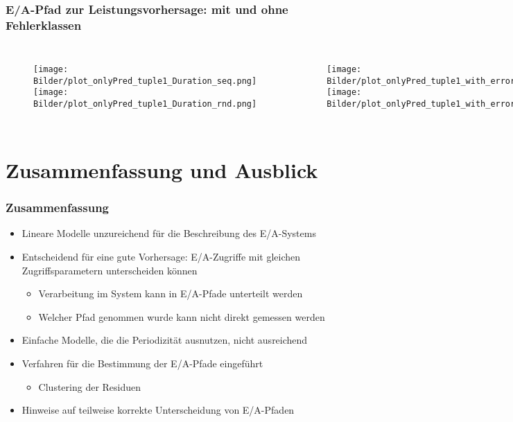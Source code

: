 \documentclass{beamer}
\begin{document}
\begin{frame}
\frametitle{E/A-Pfad zur Leistungsvorhersage: mit und ohne Fehlerklassen}
\begin{columns}
	\begin{figure}
		\texttt{[image: Bilder/plot\_onlyPred\_tuple1\_Duration\_seq.png]}\\
		\texttt{[image: Bilder/plot\_onlyPred\_tuple1\_Duration\_rnd.png]}
	\end{figure}
		\begin{figure}
		\texttt{[image: Bilder/plot\_onlyPred\_tuple1\_with\_error\_class\_from\_linreg\_Duration\_seq.png]}\\
		\texttt{[image: Bilder/plot\_onlyPred\_tuple1\_with\_error\_class\_from\_linreg\_Duration\_rnd.png]}
	\end{figure}
\end{columns}
\end{frame}

\section{Zusammenfassung und Ausblick}
\begin{frame}
\frametitle{Zusammenfassung}
\begin{itemize}
	\item Lineare Modelle unzureichend für die Beschreibung des E/A-Systems
	\item Entscheidend für eine gute Vorhersage: E/A-Zugriffe mit gleichen Zugriffsparametern unterscheiden können
	\begin{itemize}
		\item Verarbeitung im System kann in E/A-Pfade unterteilt werden
		\item Welcher Pfad genommen wurde kann nicht direkt gemessen werden
	\end{itemize}
	\item Einfache Modelle, die die Periodizität ausnutzen, nicht ausreichend
	\item Verfahren für die Bestimmung der E/A-Pfade eingeführt
	\begin{itemize}
		\item Clustering der Residuen
	\end{itemize}
	\item Hinweise auf teilweise korrekte Unterscheidung von E/A-Pfaden
\end{itemize}	
\end{frame}
\end{document}
